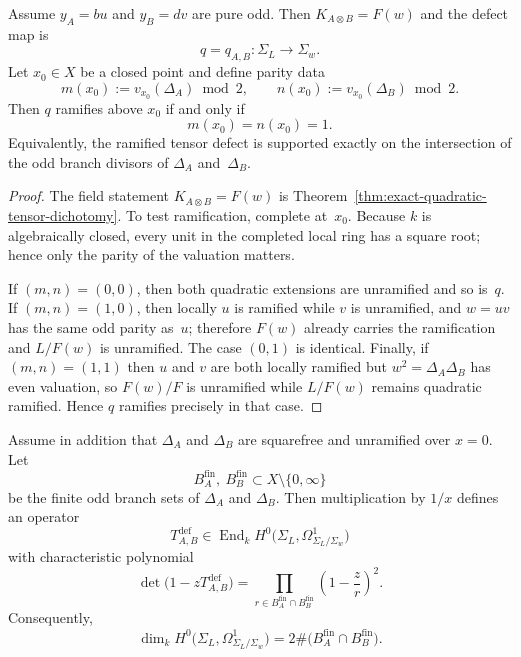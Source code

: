 \begin{theorem}
\label{thm:pure-odd-defect-ramification}
Assume $y_A=bu$ and $y_B=dv$ are pure odd.  Then
$K_{A\otimes B}=F(w)$ and the defect map is
\[
q=q_{A,B}\colon \Sigma_L\to \Sigma_w.
\]
Let $x_0\in X$ be a closed point and define parity data
\[
m(x_0):=v_{x_0}(\Delta_A)\bmod 2,
\qquad
n(x_0):=v_{x_0}(\Delta_B)\bmod 2.
\]
Then $q$ ramifies above $x_0$ if and only if
\[
m(x_0)=n(x_0)=1.
\]
Equivalently, the ramified tensor defect is supported exactly on the
intersection of the odd branch divisors of $\Delta_A$ and~$\Delta_B$.
\end{theorem}

\begin{proof}
The field statement $K_{A\otimes B}=F(w)$ is
Theorem~\ref{thm:exact-quadratic-tensor-dichotomy}.  To test ramification,
complete at~$x_0$.  Because $k$ is algebraically closed, every unit in the
completed local ring has a square root; hence only the parity of the valuation
matters.

If $(m,n)=(0,0)$, then both quadratic extensions are unramified and so is~$q$.
If $(m,n)=(1,0)$, then locally $u$ is ramified while $v$ is unramified, and
$w=uv$ has the same odd parity as~$u$; therefore $F(w)$ already carries the
ramification and $L/F(w)$ is unramified.  The case $(0,1)$ is identical.
Finally, if $(m,n)=(1,1)$ then $u$ and $v$ are both locally ramified but
$w^2=\Delta_A\Delta_B$ has even valuation, so $F(w)/F$ is unramified while
$L/F(w)$ remains quadratic ramified.  Hence $q$ ramifies precisely in that
case.
\end{proof}

\begin{corollary}
\label{cor:pure-odd-defect-operator}
Assume in addition that $\Delta_A$ and $\Delta_B$ are squarefree and unramified
over $x=0$.  Let
\[
B_A^{\mathrm{fin}},\ B_B^{\mathrm{fin}}\subset X\setminus\{0,\infty\}
\]
be the finite odd branch sets of $\Delta_A$ and $\Delta_B$.
Then multiplication by $1/x$ defines an operator
\[
T^{\mathrm{def}}_{A,B}
\in \operatorname{End}_k H^0\bigl(\Sigma_L,\Omega^1_{\Sigma_L/\Sigma_w}\bigr)
\]
with characteristic polynomial
\[
\det\bigl(1-zT^{\mathrm{def}}_{A,B}\bigr)
=
\prod_{r\in B_A^{\mathrm{fin}}\cap B_B^{\mathrm{fin}}}
\left(1-\frac{z}{r}\right)^2.
\]
Consequently,
\[
\dim_k H^0\bigl(\Sigma_L,\Omega^1_{\Sigma_L/\Sigma_w}\bigr)
=2\#\bigl(B_A^{\mathrm{fin}}\cap B_B^{\mathrm{fin}}\bigr).
\]
\end{corollary}

